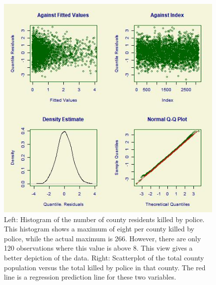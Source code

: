 \documentclass[sigconf]{acmart}
\begin{document}
\begin{figure}
\includegraphics[width=1.0\textwidth]{images/figure4.jpg}
\caption{Left: Histogram of the number of county residents killed by police.  This histogram shows a maximum of eight per county killed by police, while the actual maximum is 266.  However, there are only 120 observations where this value is above 8.  This view gives a better depiction of the data.  Right: Scatterplot of the total county population versus the total killed by police in that county.  The red line is a regression prediction line for these two variables.}
\end{figure}
\end{document}
